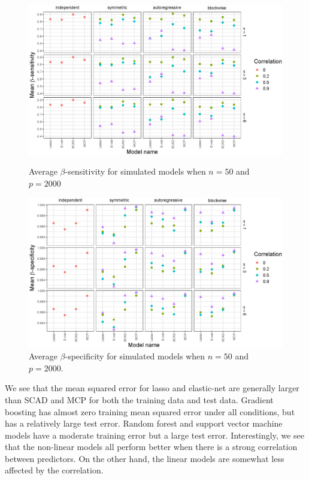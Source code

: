\documentclass{article}
\begin{document}
\begin{figure}[h!]
	\centering	
	\includegraphics[width = \textwidth]{images/facet-sensitivity/facet_sensitivity_50_2000.eps}
	\captionsetup{width = 0.8\textwidth}
	\caption{Average $\beta$-sensitivity for simulated models when $n = 50$ and $p = 2000$}
	\label{fig:sensitivity-50-2000}
	
	\bigskip
	
	\includegraphics[width = \textwidth]{images/facet-specificity/facet_specificity_50_2000.eps}
	\captionsetup{width = 0.8\textwidth}
	\caption{Average $\beta$-specificity for simulated models when $n = 50$ and $p = 2000$.}
	\label{fig:specificity-50-2000}
\end{figure}

We see that the mean squared error for lasso and elastic-net are generally larger than SCAD and MCP for both the training data and test data. Gradient boosting has almost zero training mean squared error under all conditions, but has a relatively large test error. Random forest and support vector machine models have a moderate training error but a large test error. Interestingly, we see that the non-linear models all perform better when there is a strong correlation between predictors. On the other hand, the linear models are somewhat less affected by the correlation.
\end{document}
